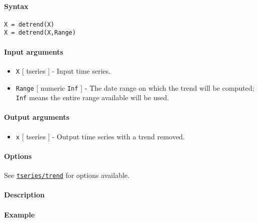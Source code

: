 


	\paragraph{Syntax}\label{syntax}

\begin{verbatim}
X = detrend(X)
X = detrend(X,Range)
\end{verbatim}

\paragraph{Input arguments}\label{input-arguments}

\begin{itemize}
\item
  \texttt{X} {[} tseries {]} - Input time series.
\item
  \texttt{Range} {[} numeric \textbar{} \texttt{Inf} {]} - The date
  range on which the trend will be computed; \texttt{Inf} means the
  entire range available will be used.
\end{itemize}

\paragraph{Output arguments}\label{output-arguments}

\begin{itemize}
\itemsep1pt\parskip0pt
\item
  \texttt{x} {[} tseries {]} - Output time series with a trend removed.
\end{itemize}

\paragraph{Options}\label{options}

See \href{tseries/trend}{\texttt{tseries/trend}} for options available.

\paragraph{Description}\label{description}

\paragraph{Example}\label{example}


